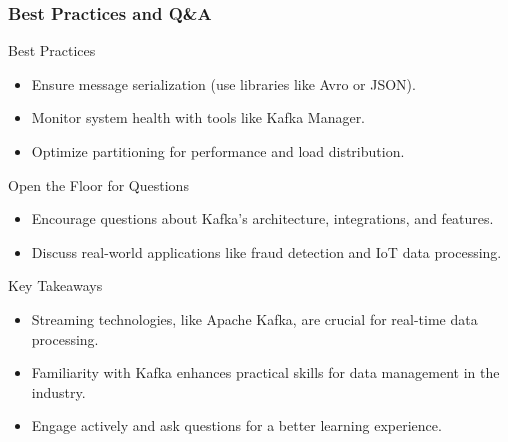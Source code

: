\documentclass[aspectratio=169]{beamer}
\begin{document}
\begin{frame}[fragile]
    \frametitle{Best Practices and Q\&A}
    
    \begin{block}{Best Practices}
        \begin{itemize}
            \item Ensure message serialization (use libraries like Avro or JSON).
            \item Monitor system health with tools like Kafka Manager.
            \item Optimize partitioning for performance and load distribution.
        \end{itemize}
    \end{block}
    
    \begin{block}{Open the Floor for Questions}
        \begin{itemize}
            \item Encourage questions about Kafka's architecture, integrations, and features.
            \item Discuss real-world applications like fraud detection and IoT data processing.
        \end{itemize}
    \end{block}
    
    \begin{block}{Key Takeaways}
        \begin{itemize}
            \item Streaming technologies, like Apache Kafka, are crucial for real-time data processing.
            \item Familiarity with Kafka enhances practical skills for data management in the industry.
            \item Engage actively and ask questions for a better learning experience.
        \end{itemize}
    \end{block}
\end{frame}
\end{document}
